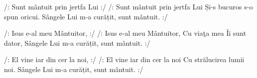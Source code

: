 \beginverse
/: Sunt mântuit prin jertfa Lui :/
/: Sunt mântuit prin jertfa Lui
Și-s bucuros s-o spun oricui.
Sângele Lui m-a curățit, sunt mântuit. :/
\endverse

\beginverse
/: Isus e-al meu Mântuitor, :/
/: Isus e-al meu Mântuitor,
Cu viaţa mea Îi sunt dator,
Sângele Lui m-a curățit, sunt mântuit. :/
\endverse

\beginverse
/: El vine iar din cer la noi, :/
/: El vine iar din cer la noi
Cu strălucirea lumii noi.
Sângele Lui m-a curățit, sunt mântuit. :/
\endverse
\endsong